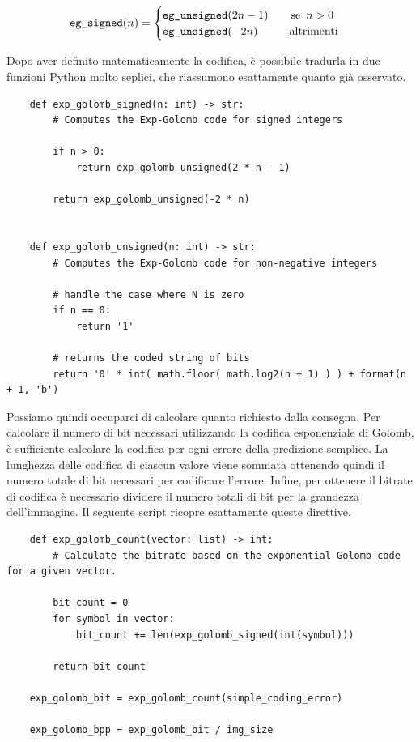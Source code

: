 \begin{gather*}
    \text{\texttt{eg\_signed}}(n) =
    \begin{cases}
        \text{\texttt{eg\_unsigned}}(2n - 1) \hspace{20px} \text{se } \, n > 0 \\
        \text{\texttt{eg\_unsigned}}(-2n) \hspace{28px} \text{altrimenti}
    \end{cases}
\end{gather*}

\noindent Dopo aver definito matematicamente la codifica, è possibile tradurla in due funzioni Python molto seplici, che riassumono esattamente quanto già osservato.

\begin{lstlisting}
    def exp_golomb_signed(n: int) -> str:
        # Computes the Exp-Golomb code for signed integers
        
        if n > 0:
            return exp_golomb_unsigned(2 * n - 1)
            
        return exp_golomb_unsigned(-2 * n)
        

    def exp_golomb_unsigned(n: int) -> str:
        # Computes the Exp-Golomb code for non-negative integers

        # handle the case where N is zero
        if n == 0:
            return '1'
        
        # returns the coded string of bits
        return '0' * int( math.floor( math.log2(n + 1) ) ) + format(n + 1, 'b')
\end{lstlisting}

\noindent Possiamo quindi occuparci di calcolare quanto richiesto dalla consegna. Per calcolare il numero di bit necessari utilizzando la codifica esponenziale di Golomb, è sufficiente calcolare la codifica per ogni errore della predizione semplice. La lunghezza delle codifica di ciascun valore viene sommata ottenendo quindi il numero totale di bit necessari per codificare l'errore. Infine, per ottenere il bitrate di codifica è necessario dividere il numero totali di bit per la grandezza dell'immagine. Il seguente script ricopre esattamente queste direttive.

\begin{lstlisting}
    def exp_golomb_count(vector: list) -> int:
        # Calculate the bitrate based on the exponential Golomb code for a given vector.

        bit_count = 0
        for symbol in vector:
            bit_count += len(exp_golomb_signed(int(symbol)))

        return bit_count

    exp_golomb_bit = exp_golomb_count(simple_coding_error) 

    exp_golomb_bpp = exp_golomb_bit / img_size
\end{lstlisting}

